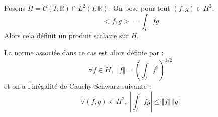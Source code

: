 \documentclass[french,11pt,twoside]{VcCours}
\begin{document}
 \begin{Demonstration}{}
 \vspace{8.5cm}
 \end{Demonstration}
 
 \begin{Proposition}{} Posons $H = \mathcal{C}(I, \mathbb{R}) \cap L^2(I, \mathbb{R})$. On pose pour tout $(f,g) \in H^2$,
 $$ <f,g> = \int_{I} fg$$
Alors cela définit un produit scalaire sur $H$.
 \end{Proposition}
 
 
\begin{Demonstration}{}
 
 \vspace{4cm}
 \end{Demonstration}
 
\begin{Remarque}{} La norme associée dans ce cas est alors définie par :
$$ \forall f \in H, \; \Vert f \Vert = \left( \int_{I} f^2 \right)^{1/2} $$
et on a l'inégalité de Cauchy-Schwarz suivante :
$$ \forall (f,g) \in H^2, \; \left\vert \int_{I} fg  \right\vert \leq  \Vert f \Vert \, \Vert g \Vert $$
\end{Remarque}
\end{document}
